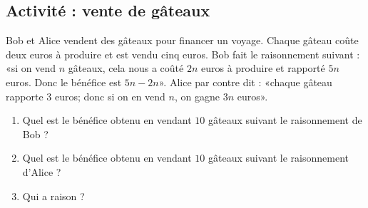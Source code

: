 
\subsection*{Activité : vente de gâteaux}

Bob et Alice vendent des gâteaux pour financer un voyage. Chaque gâteau coûte deux euros à produire et est vendu cinq euros. Bob fait le raisonnement suivant : «si on vend \( n\) gâteaux, cela nous a coûté \( 2n\) euros à produire et rapporté \( 5n\) euros. Donc le bénéfice est \( 5n-2n\)». Alice par contre dit : «chaque gâteau rapporte \( 3\) euros; donc si on en vend \( n\), on gagne \( 3n\) euros». 
\begin{enumerate}
    \item
        Quel est le bénéfice obtenu en vendant \( 10\) gâteaux suivant le raisonnement de Bob ?
    \item
        Quel est le bénéfice obtenu en vendant \( 10\) gâteaux suivant le raisonnement d'Alice ?
    \item
        Qui a raison ?
\end{enumerate}
